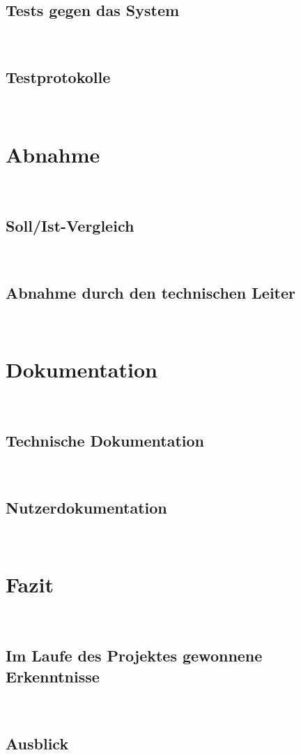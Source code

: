 \documentclass[11pt,toc=sectionentrywithoutdots, headheight=44pt, headings=optiontoheadandtoc, hyperfootnotes=false]{scrartcl}
\begin{document}
\subsection{Tests gegen das System}
\blindtext\

\subsection{Testprotokolle}
\blindtext\

\section{Abnahme}
\blindtext\

\subsection{Soll/Ist-Vergleich}
\blindtext\

\subsection{Abnahme durch den technischen Leiter}
\blindtext\

\section{Dokumentation}
\blindtext\

\subsection{Technische Dokumentation}
\blindtext\

\subsection{Nutzerdokumentation}
\blindtext\

\section{Fazit}
\blindtext\

\subsection{Im Laufe des Projektes gewonnene Erkenntnisse}
\blindtext\

\subsection{Ausblick}
\blindtext\
\end{document}
